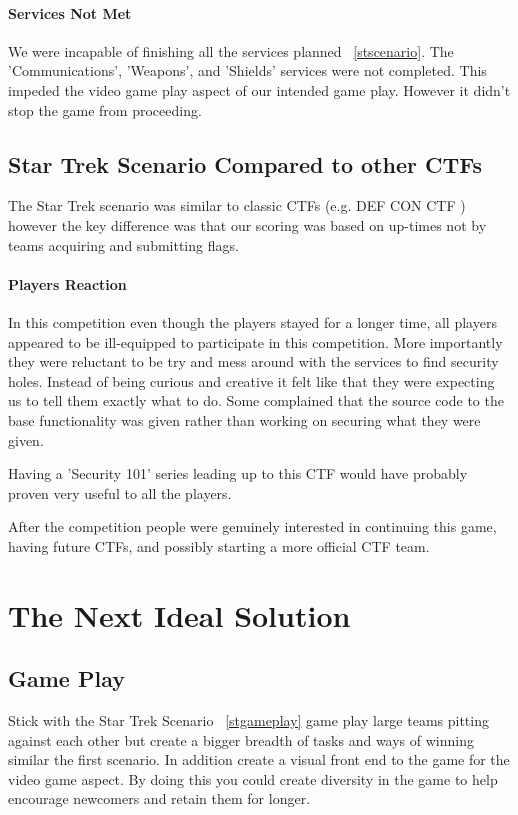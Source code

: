 \documentclass[10pt]{article}
\begin{document}
\paragraph*{Services Not Met}
We were incapable of finishing all the services planned ~\ref{stscenario}. The 
'Communications', 'Weapons', and 'Shields' services were not completed. This 
impeded the video game play aspect of our intended game play. However it didn't stop 
the game from proceeding.

\subsection{Star Trek Scenario Compared to other CTFs}
The Star Trek scenario was similar to classic CTFs (e.g. DEF CON CTF \cite{DEFCONCTF}) 
however the key difference was that our scoring was based on up-times not by teams 
acquiring and submitting flags.

\paragraph*{Players Reaction}
In this competition even though the players stayed for a longer time, all players appeared
to be ill-equipped to participate in this competition. More importantly they were reluctant
to be try and mess around with the services to find security holes.
Instead of being curious and creative it felt like that they were expecting us to tell them
exactly what to do. Some complained that the source code to the base functionality was given
rather than working on securing what they were given.

Having a 'Security 101' series leading up to this CTF would have probably proven very
useful to all the players.

After the competition people were genuinely interested in continuing this game, having
future CTFs, and possibly starting a more official CTF team.

\section{The Next Ideal Solution}

\subsection{Game Play}
Stick with the Star Trek Scenario ~\ref{stgameplay} game play large teams pitting against each other 
but create a bigger breadth of tasks and ways of winning similar the first
scenario. In addition create a visual front end to the game for the video game
aspect. By doing this you could create diversity in the game to help encourage
newcomers and retain them for longer.
\end{document}

